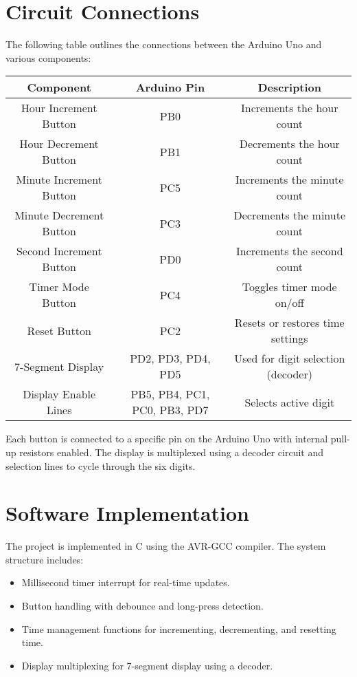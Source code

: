 \documentclass{article}
\begin{document}
\section{Circuit Connections}
The following table outlines the connections between the Arduino Uno and various components:
\newpage
\begin{longtable}{|c|c|c|}
\hline
Component & Arduino Pin & Description \\
\hline
Hour Increment Button & PB0 & Increments the hour count \\
Hour Decrement Button & PB1 & Decrements the hour count \\
Minute Increment Button & PC5 & Increments the minute count \\
Minute Decrement Button & PC3 & Decrements the minute count \\
Second Increment Button & PD0 & Increments the second count \\
Timer Mode Button & PC4 & Toggles timer mode on/off \\
Reset Button & PC2 & Resets or restores time settings \\
7-Segment Display & PD2, PD3, PD4, PD5 & Used for digit selection (decoder) \\
Display Enable Lines & PB5, PB4, PC1, PC0, PB3, PD7 & Selects active digit \\
\hline
\end{longtable}

Each button is connected to a specific pin on the Arduino Uno with internal pull-up resistors enabled. The display is multiplexed using a decoder circuit and selection lines to cycle through the six digits.

\section{Software Implementation}
The project is implemented in C using the AVR-GCC compiler. The system structure includes:
\begin{itemize}
\item Millisecond timer interrupt for real-time updates.
\item Button handling with debounce and long-press detection.
\item Time management functions for incrementing, decrementing, and resetting time.
\item Display multiplexing for 7-segment display using a decoder.
\end{itemize}
\end{document}
